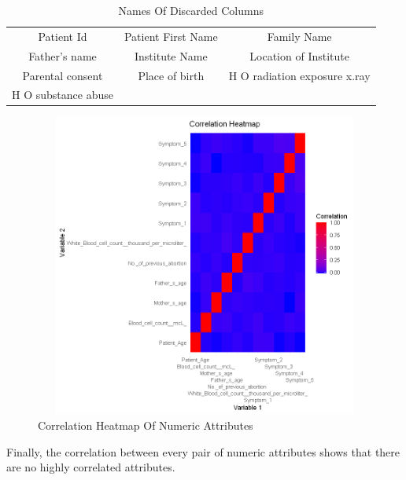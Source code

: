 \begin{table}[htpb]
	\caption{Names Of Discarded Columns}
	\centering
	\begin{tabular}{|c|c|c|}
		\hline
		Patient Id & Patient First Name & Family Name \\
		Father's name & Institute Name  & Location of Institute\\
		Parental consent & Place of birth & H O radiation exposure x.ray\\
		H O substance abuse & & \\
		\hline
	\end{tabular}
	\label{tabl:discarded}
\end{table}

\begin{figure}[htpb]
	\centering
	\includegraphics[height=10cm, width=12cm]{figures/corr.png}
	\caption{Correlation Heatmap Of Numeric Attributes}
	\label{fig 3}
\end{figure}

\noindent
Finally, the correlation between every pair of numeric attributes shows that there are no highly correlated attributes.

\newpage
